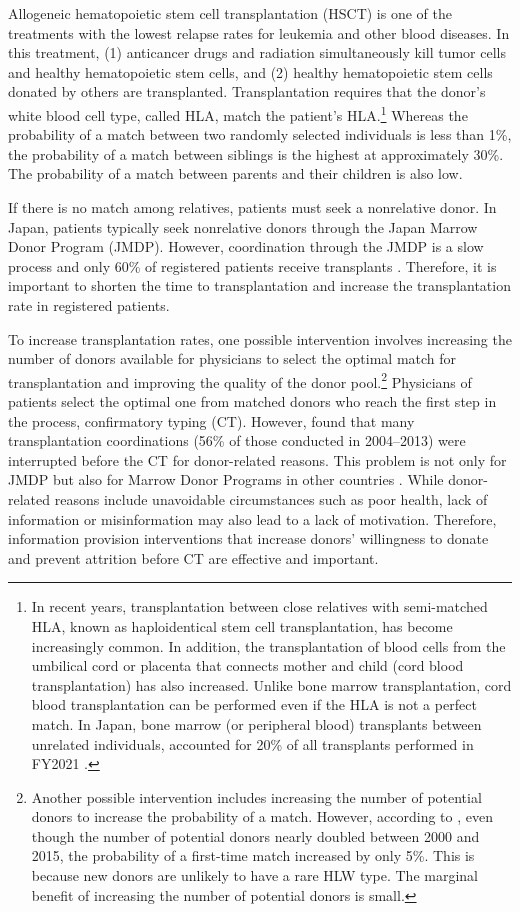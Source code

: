 \documentclass[12pt, a4paper]{article}
\begin{document}
Allogeneic hematopoietic stem cell transplantation (HSCT) is one of the treatments with the lowest relapse rates for leukemia and other blood diseases. In this treatment, (1) anticancer drugs and radiation simultaneously kill tumor cells and healthy hematopoietic stem cells, and (2) healthy hematopoietic stem cells donated by others are transplanted. Transplantation requires that the donor's white blood cell type, called HLA, match the patient's HLA.\footnote{In recent years, transplantation between close relatives with semi-matched HLA, known as haploidentical stem cell transplantation, has become increasingly common. In addition, the transplantation of blood cells from the umbilical cord or placenta that connects mother and child (cord blood transplantation) has also increased. Unlike bone marrow transplantation, cord blood transplantation can be performed even if the HLA is not a perfect match. In Japan, bone marrow (or peripheral blood) transplants between unrelated individuals, accounted for 20\% of all transplants performed in FY2021 \citep{JapaneseDataCenterf2022}.} Whereas the probability of a match between two randomly selected individuals is less than 1\%, the probability of a match between siblings is the highest at approximately 30\%. The probability of a match between parents and their children is also low.

If there is no match among relatives, patients must seek a nonrelative donor. In Japan, patients typically seek nonrelative donors through the Japan Marrow Donor Program (JMDP). However, coordination through the JMDP is a slow process and only 60\% of registered patients receive transplants \citep{Hirakawa2018}. Therefore, it is important to shorten the time to transplantation and increase the transplantation rate in registered patients.

To increase transplantation rates, one possible intervention involves increasing the number of donors available for physicians to select the optimal match for transplantation and improving the quality of the donor pool.\footnote{Another possible intervention includes increasing the number of potential donors to increase the probability of a match. However, according to \citet{Takanashi2016}, even though the number of potential donors nearly doubled between 2000 and 2015, the probability of a first-time match increased by only 5\%. This is because new donors are unlikely to have a rare HLW type. The marginal benefit of increasing the number of potential donors is small.} Physicians of patients select the optimal one from matched donors who reach the first step in the process, confirmatory typing (CT). However, \citet{Hirakawa2018} found that many transplantation coordinations (56\% of those conducted in 2004--2013) were interrupted before the CT for donor-related reasons. This problem is not only for JMDP but also for Marrow Donor Programs in other countries \citep{Haylock2024}. While donor-related reasons include unavoidable circumstances such as poor health, lack of information or misinformation may also lead to a lack of motivation. Therefore, information provision interventions that increase donors' willingness to donate and prevent attrition before CT are effective and important.
\end{document}
